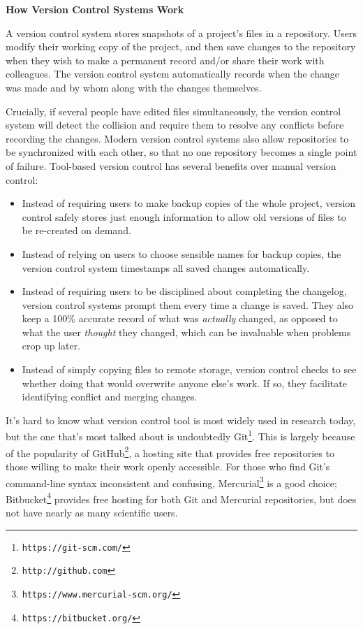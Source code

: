 \documentclass[10pt]{article}
\newcommand{\withurl}[2]{{#1}\footnote{\texttt{#2}}}
\begin{document}
\begin{framed}
  \noindent \textbf{How Version Control Systems Work}

  A version control system stores snapshots of a project's files in a
  repository. Users modify their working copy of the project, and then 
  save changes to the repository when they wish to make
  a permanent record and/or share their work with colleagues. The
  version control system automatically records when the change was
  made and by whom along with the changes themselves.

  Crucially, if several people have edited files simultaneously, the
  version control system will detect the collision and require them to
  resolve any conflicts before recording the changes. Modern version
  control systems also allow repositories to be synchronized with each
  other, so that no one repository becomes a single point of failure.
  Tool-based version control has several benefits over manual version
  control:

  \begin{itemize}

  \item
    Instead of requiring users to make backup copies of the whole project,
    version control safely stores just enough information to allow old
    versions of files to be re-created on demand.

  \item
    Instead of relying on users to choose sensible names for backup
    copies, the version control system timestamps all saved changes
    automatically.

  \item
    Instead of requiring users to be disciplined about completing the 
    changelog, version control systems prompt them every time a change
    is saved. They also keep a 100\% accurate record of what was
    \emph{actually} changed, as opposed to what the user
    \emph{thought} they changed, which can be invaluable when problems
    crop up later.

  \item
    Instead of simply copying files to remote storage, version control
    checks to see whether doing that would overwrite anyone else's
    work. If so, they facilitate identifying conflict and merging changes. 

  \end{itemize}
\end{framed}

It's hard to know what version control tool is most widely used in
research today, but the one that's most talked about is undoubtedly
\withurl{Git}{https://git-scm.com/}.  This is largely because of the
popularity of \withurl{GitHub}{http://github.com}, a hosting site that
provides free repositories to those willing to make their work openly
accessible.  For those who find Git's command-line syntax inconsistent
and confusing, \withurl{Mercurial}{https://www.mercurial-scm.org/} is
a good choice; \withurl{Bitbucket}{https://bitbucket.org/} provides
free hosting for both Git and Mercurial repositories, but does not
have nearly as many scientific users.
\end{document}
